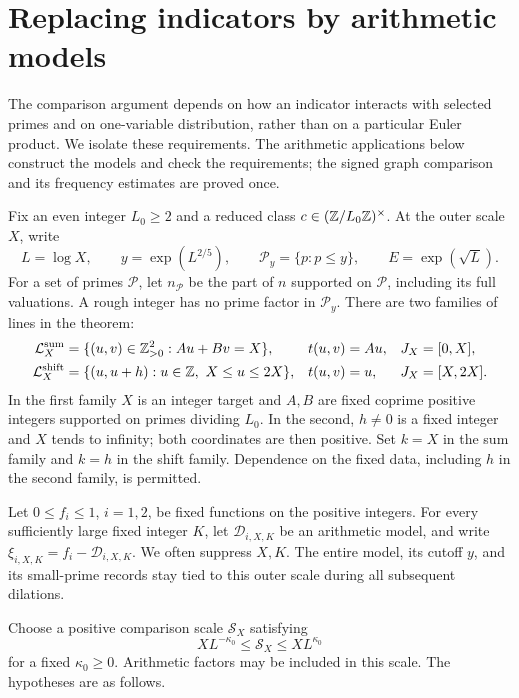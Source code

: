 \section{Replacing indicators by arithmetic models}\label{sec:comparison}

The comparison argument depends on how an indicator interacts with
selected primes and on one-variable distribution, rather than on a
particular Euler product. We isolate these requirements. The arithmetic
applications below construct the models and check the requirements;
the signed graph comparison and its frequency estimates are proved once.

Fix an even integer \(L_0\ge2\) and a reduced class
\(c\in(\mathbb Z/L_0\mathbb Z)^\times\). At the outer scale \(X\), write
\[
 L=\log X,\qquad y=\exp(L^{2/5}),\qquad
 \mathcal P_y=\{p:p\le y\},\qquad E=\exp(\sqrt L).
\]
For a set of primes \(\mathcal P\), let \(n_{\mathcal P}\) be the
part of \(n\) supported on \(\mathcal P\), including its full
valuations. A rough integer has no prime factor in \(\mathcal P_y\).
There are two families of lines in the theorem:
\begin{align*}
 \mathcal L_X^{\rm sum}&=\{(u,v)\in\mathbb Z_{>0}^2:Au+Bv=X\},
       &t(u,v)&=Au, &J_X&=[0,X],\\
 \mathcal L_X^{\rm shift}&=\{(u,u+h):u\in\mathbb Z,\ X\le u\le2X\},
       &t(u,v)&=u, &J_X&=[X,2X].
\end{align*}
In the first family \(X\) is an integer target and \(A,B\) are
fixed coprime positive integers supported on primes dividing \(L_0\).
In the second, \(h\ne0\) is a fixed integer and \(X\) tends to
infinity; both coordinates are then positive. Set \(k=X\) in the
sum family and \(k=h\) in the shift family. Dependence on the
fixed data, including \(h\) in the second family, is permitted.

Let \(0\le f_i\le1\), \(i=1,2\), be fixed functions on the
positive integers. For every sufficiently large fixed integer \(K\),
let \(\mathcal D_{i,X,K}\) be an arithmetic model, and write
\(\xi_{i,X,K}=f_i-\mathcal D_{i,X,K}\). We often suppress \(X,K\).
The entire model, its cutoff \(y\), and its small-prime records stay
tied to this outer scale during all subsequent dilations.

Choose a positive comparison scale \(\mathcal S_X\) satisfying
\begin{equation}\label{eq:comparison-scale}
        XL^{-\kappa_0}\le\mathcal S_X\le XL^{\kappa_0}
\end{equation}
for a fixed \(\kappa_0\ge0\). Arithmetic factors may be included
in this scale. The hypotheses are as follows.

